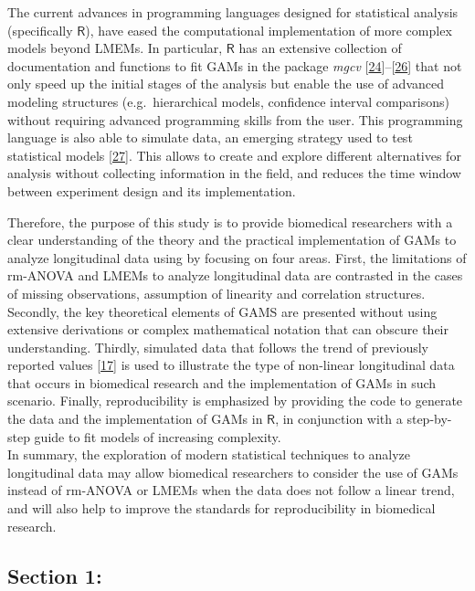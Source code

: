 \documentclass[
]{article}
\begin{document}
The current advances in programming languages designed for statistical
analysis (specifically \(\textsf{R}\)), have eased the computational
implementation of more complex models beyond LMEMs. In particular,
\(\textsf{R}\) has an extensive collection of documentation and
functions to fit GAMs in the package \emph{mgcv}
{[}\protect\hyperlink{ref-wood2017}{24}{]}--{[}\protect\hyperlink{ref-wood2016}{26}{]}
that not only speed up the initial stages of the analysis but enable the
use of advanced modeling structures (e.g.~hierarchical models,
confidence interval comparisons) without requiring advanced programming
skills from the user. This programming language is also able to simulate
data, an emerging strategy used to test statistical models
{[}\protect\hyperlink{ref-haverkamp2017}{27}{]}. This allows to create
and explore different alternatives for analysis without collecting
information in the field, and reduces the time window between experiment
design and its implementation.

Therefore, the purpose of this study is to provide biomedical
researchers with a clear understanding of the theory and the practical
implementation of GAMs to analyze longitudinal data using by focusing on
four areas. First, the limitations of rm-ANOVA and LMEMs to analyze
longitudinal data are contrasted in the cases of missing observations,
assumption of linearity and correlation structures. Secondly, the key
theoretical elements of GAMS are presented without using extensive
derivations or complex mathematical notation that can obscure their
understanding. Thirdly, simulated data that follows the trend of
previously reported values
{[}\protect\hyperlink{ref-vishwanath2009}{17}{]} is used to illustrate
the type of non-linear longitudinal data that occurs in biomedical
research and the implementation of GAMs in such scenario. Finally,
reproducibility is emphasized by providing the code to generate the data
and the implementation of GAMs in \(\textsf{R}\), in conjunction with a
step-by-step guide to fit models of increasing complexity.\\
In summary, the exploration of modern statistical techniques to analyze
longitudinal data may allow biomedical researchers to consider the use
of GAMs instead of rm-ANOVA or LMEMs when the data does not follow a
linear trend, and will also help to improve the standards for
reproducibility in biomedical research.

\hypertarget{section-1}{%
\subsection{Section 1:}\label{section-1}}
\end{document}
